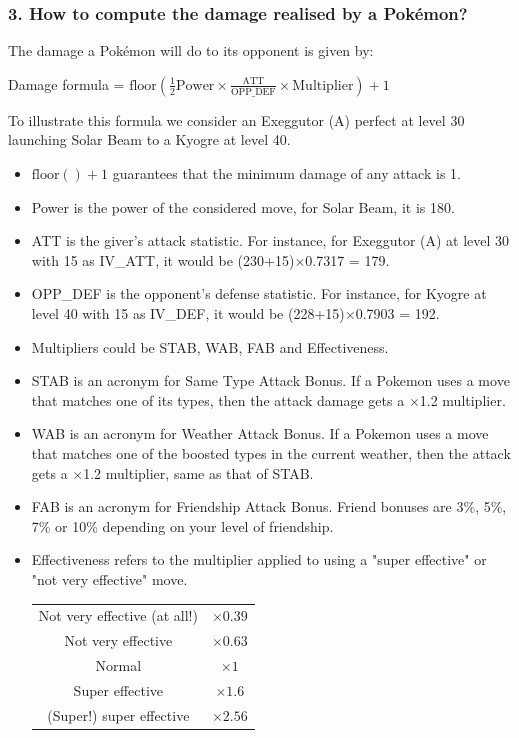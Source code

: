 \documentclass[8pt,aspectratio=169,compress]{beamer}
\begin{document}
\begin{frame}
\frametitle{3. How to compute the damage realised by a Pokémon?}

\begin{block}{}
\begin{tiny}
The damage a Pok\'emon will do to its opponent is given by:
\begin{center}
Damage formula = $\text{floor}\left(\frac{1}{2}\text{Power} \times \frac{\text{ATT}}{\text{OPP\_DEF}}\times\text{Multiplier}\right) +1$
\end{center}

To illustrate this formula we consider an Exeggutor (A) perfect at level 30 launching Solar Beam to a Kyogre at level 40.
\begin{itemize}
  \item $\text{floor}\left(\right)+1$ guarantees that the minimum damage of any attack is 1.
  \item Power is the power of the considered move, for Solar Beam, it is 180.
  \item ATT is the giver's attack statistic. For instance, for Exeggutor (A) at level 30 with 15 as IV\_ATT, it would be (230+15)$\times$0.7317 = 179.
  \item OPP\_DEF is the opponent's defense statistic. For instance, for Kyogre at level 40 with 15 as IV\_DEF, it would be (228+15)$\times$0.7903 = 192.
  \item Multipliers could be STAB, WAB, FAB and Effectiveness.
  \item STAB is an acronym for Same Type Attack Bonus. If a Pokemon uses a move that matches one of its types, then the attack damage gets a $\times$1.2 multiplier.
  \item WAB is an acronym for Weather Attack Bonus. If a Pokemon uses a move that matches one of the boosted types in the current weather, then the attack gets a $\times$1.2 multiplier, same as that of STAB.
  \item FAB is an acronym for Friendship Attack Bonus. Friend bonuses are 3\%, 5\%, 7\% or 10\% depending on your level of friendship.
  \item Effectiveness refers to the multiplier applied to using a "super effective" or "not very effective" move.  

\begin{center}
\begin{tabular}{cc}
Not very effective (at all!) & $\times 0.39$ \\
Not very effective & $\times 0.63$ \\
Normal & $\times 1$ \\
Super effective & $\times 1.6$  \\ 
(Super!) super effective & $\times 2.56$ \\
\end{tabular} 
\end{center}
\end{itemize}


\end{tiny}
\end{block}
\end{frame}
\end{document}
